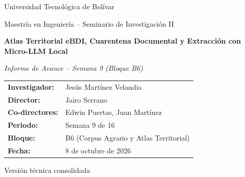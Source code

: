 \documentclass[11pt,a4paper]{article}
\begin{document}
\begin{titlepage}
    \thispagestyle{empty}
    \centering
    \vspace*{1.5cm}

    {\large Universidad Tecnológica de Bolívar\par}
    \vspace{0.3cm}
    {\normalsize Maestría en Ingeniería -- Seminario de Investigación II\par}

    \vspace{2.2cm}
    {\LARGE\bfseries Atlas Territorial eBDI, Cuarentena Documental y Extracción con Micro-LLM Local\par}

    \vspace{0.8cm}
    {\large\itshape Informe de Avance -- Semana 9 (Bloque B6)\par}

    \vspace{2.5cm}
    \begin{tabular}{ll}
        \textbf{Investigador:} & Jesús Martínez Velandia \\
        \textbf{Director:} & Jairo Serrano \\
        \textbf{Co-directores:} & Edwin Puertas, Juan Martínez \\
        \textbf{Periodo:} & Semana 9 de 16 \\
        \textbf{Bloque:} & B6 (Corpus Agrario y Atlas Territorial) \\
        \textbf{Fecha:} & 8 de octubre de 2026 \\
    \end{tabular}

    \vfill
    {\small Versión técnica consolidada\par}
    \vspace*{1.0cm}
\end{titlepage}

\newpage
{}
\fancyfoot[C]{\small \thepage}
\tableofcontents
\newpage

\setcounter{page}{1}
\end{document}

